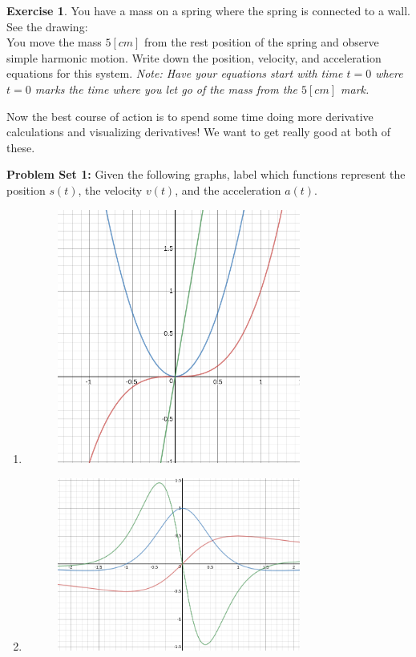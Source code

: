 \documentclass[leqno]{article}
\theoremstyle{definition}
\newtheorem{exercise}{Exercise}[section]
\theoremstyle{remark}
\theoremstyle{theorem}
\begin{document}
\begin{exercise}
You have a mass on a spring where the spring is connected to a wall.  See the drawing:
\vspace*{6cm}\\

You move the mass $5[cm]$ from the rest position of the spring and observe simple harmonic motion.  Write down the position, velocity, and acceleration equations for this system.  \emph{Note: Have your equations start with time $t=0$ where $t=0$ marks the time where you let go of the mass from the $5[cm]$ mark.}
\vspace*{6cm}\\
\end{exercise}


Now the best course of action is to spend some time doing more derivative calculations and visualizing derivatives!  We want to get really good at both of these.

\noindent \textbf{Problem Set 1:} Given the following graphs, label which functions represent the position $s(t)$, the velocity $v(t)$, and the acceleration $a(t)$.
\begin{enumerate}[1.]
\item
\begin{figure}[h]
\begin{center}
\includegraphics[width=8cm]{position_velocity_acceleration_1.png}
\end{center}
\end{figure}

\item 
\begin{figure}[h]
\begin{center}
\includegraphics[width=8cm]{position_velocity_acceleration_2.png}
\end{center}
\end{figure}
\end{enumerate}
\end{document}
